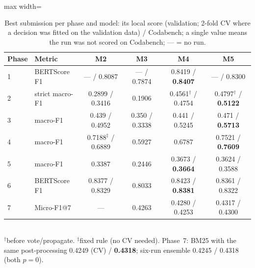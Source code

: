 \documentclass[11pt, oneside]{article}
\newcommand{\best}[1]{\textbf{#1}}
\begin{document}
\begin{table}[htbp]
\centering\small
\caption{Best submission per phase and model: its local score (validation; 2-fold CV where a decision was fitted on the
validation data) / Codabench; a single value means the run was not scored on Codabench; --- = no run.}
\label{tab:results}
\begin{adjustbox}{max width=\textwidth}
\begin{tabular}{llcccc}
\toprule
Phase & Metric & M2 & M3 & M4 & M5\\
\midrule
1 & BERTScore F1 & --- / 0.8087 & --- / 0.7874 & 0.8419 / \best{0.8407} & --- / 0.8300\\
2 & strict macro-F1 & 0.2899 / 0.3416 & 0.1906 & 0.4561$^\dagger$ / 0.4754 & 0.4797$^\dagger$ / \best{0.5122}\\
3 & macro-F1 & 0.439 / 0.4952 & 0.350 / 0.3338 & 0.441 / 0.5245 & 0.471 / \best{0.5713}\\
4 & macro-F1 & 0.7188$^\ddagger$ / 0.6889 & 0.5927 & 0.6787 & 0.7521 / \best{0.7609}\\
5 & macro-F1 & 0.3387 & 0.2446 & 0.3673 / \best{0.3664} & 0.3624 / 0.3588\\
6 & BERTScore F1 & 0.8377 / 0.8329 & 0.8033 & 0.8423 / \best{0.8381} & 0.8361 / 0.8322\\
7 & Micro-F1@7 & --- & 0.4263 & 0.4280 / 0.4253 & 0.4317 / 0.4300\\
\bottomrule
\end{tabular}
\end{adjustbox}
\\[1pt]{\footnotesize $^\dagger$before vote/propagate. $^\ddagger$fixed rule (no CV needed). Phase~7: BM25 with the same
post-processing 0.4249 (CV) / \best{0.4318}; six-run ensemble 0.4245 / 0.4318 (both $p{=}0$).}
\end{table}
\end{document}
